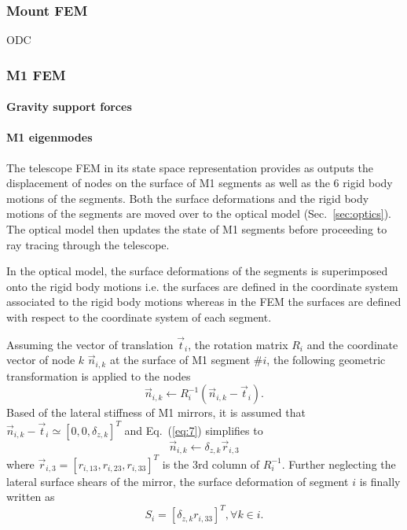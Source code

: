 \documentclass{gmto}
\begin{document}
\subsubsection{Mount FEM}
\label{sec:mount-fem}

ODC\cite{}

\subsubsection{M1 FEM}
\label{sec:m1-fem}

\paragraph{Gravity support forces}

\paragraph{M1 eigenmodes}

The telescope FEM in its state space representation provides as outputs the
displacement of nodes on the surface of M1 segments as well as the 6 rigid body
motions of the segments.
Both the surface deformations and the rigid body motions of the segments are
moved over to the optical model (Sec.~\ref{sec:optics}).
The optical model then updates the state of M1 segments before proceeding to ray
tracing through the telescope.

In the optical model, the surface deformations of the segments is superimposed
onto the rigid body motions i.e. the surfaces are defined in the coordinate system
associated to the rigid body motions whereas in the FEM the surfaces are defined with
respect to the coordinate system of each segment\cite{GMTO.CoordinateSystems}.

Assuming the vector of translation $\vec t_i$, the rotation matrix $R_i$ and the
coordinate vector of node $k$ $\vec n_{i,k}$ at the surface of M1 segment \#$i$, the following
geometric transformation is applied to the nodes
\begin{equation}
  \label{eq:7}
  \vec n_{i,k} \leftarrow R_i^{-1}(\vec n_{i,k}-\vec t_i).
\end{equation}
Based of the lateral stiffness of M1 mirrors, it is assumed that $\vec
n_{i,k}-\vec t_i \simeq [0,0,\delta_{z,k}]^T$ and Eq.~(\ref{eq:7}) simplifies to
\begin{equation}
  \label{eq:8}
  \vec n_{i,k} \leftarrow \delta_{z,k} \vec r_{i,3} 
\end{equation}
where $\vec r_{i,3} = [r_{i,13},r_{i,23},r_{i,33}]^T$ is the 3rd column of $R_i^{-1}$.
Further neglecting the lateral surface shears of the mirror, the surface
deformation of segment $i$ is finally written as
\begin{equation}
  \label{eq:8}
  S_i = [\delta_{z,k}r_{i,33}]^T,\forall k \in i.
\end{equation}
\end{document}
